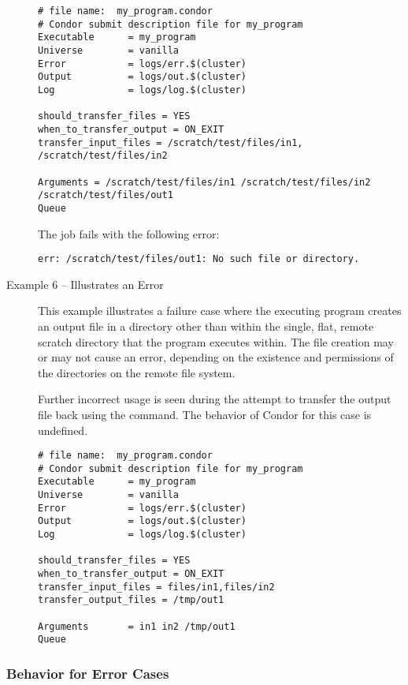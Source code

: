 \begin{description}
\footnotesize
\begin{verbatim}
# file name:  my_program.condor
# Condor submit description file for my_program
Executable      = my_program
Universe        = vanilla
Error           = logs/err.$(cluster)
Output          = logs/out.$(cluster)
Log             = logs/log.$(cluster)

should_transfer_files = YES
when_to_transfer_output = ON_EXIT
transfer_input_files = /scratch/test/files/in1, /scratch/test/files/in2

Arguments = /scratch/test/files/in1 /scratch/test/files/in2 /scratch/test/files/out1
Queue
\end{verbatim}
\normalsize

The job fails with the following error:
\footnotesize
\begin{verbatim}
err: /scratch/test/files/out1: No such file or directory.
\end{verbatim}
\normalsize

\item[Example 6 -- Illustrates an Error]

This example illustrates a failure case
where the executing program creates an output file in a directory
other than within the single, flat, remote scratch directory that the 
program executes within.
The file creation may or may not cause an error,
depending on the existence and permissions
of the directories on the remote file system.

Further incorrect usage is seen during
the attempt to transfer the output file back 
using the  command.
The behavior of Condor for this case is undefined.

\footnotesize
\begin{verbatim}
# file name:  my_program.condor
# Condor submit description file for my_program
Executable      = my_program
Universe        = vanilla
Error           = logs/err.$(cluster)
Output          = logs/out.$(cluster)
Log             = logs/log.$(cluster)

should_transfer_files = YES
when_to_transfer_output = ON_EXIT
transfer_input_files = files/in1,files/in2
transfer_output_files = /tmp/out1

Arguments       = in1 in2 /tmp/out1
Queue
\end{verbatim}
\normalsize

\end{description}

\subsubsection{Behavior for Error Cases}
\Todo

